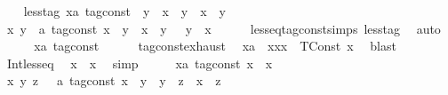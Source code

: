 \begin{isabellebody}
\isanewline
\ \ \isamarkupfalse%
\ less{\isacharunderscore}tag{\isacharcolon}\ {\isacartoucheopen}{\isacharparenleft}x{\isacharcolon}{\isacharcolon}{\isacharprime}a\ tag{\isacharunderscore}const{\isacharparenright}\ {\isacharless}\ y\ {\isasymlongleftrightarrow}\ {\isacharparenleft}x\ {\isasymle}\ y{\isacharparenright}\ {\isasymand}\ {\isacharparenleft}x\ {\isasymnoteq}\ y{\isacharparenright}{\isacartoucheclose}\isanewline
\isanewline
{}\isamarkupfalse%
%
\isadelimproof
\ %
\endisadelimproof
%
\isatagproof
{}\isamarkupfalse%
\isanewline
\ \ \isamarkupfalse%
\ {\isacartoucheopen}{\isasymAnd}x\ y\ {\isacharcolon}{\isacharcolon}\ {\isacharprime}a\ tag{\isacharunderscore}const{\isachardot}\ {\isacharparenleft}x\ {\isacharless}\ y{\isacharparenright}\ {\isacharequal}\ {\isacharparenleft}x\ {\isasymle}\ y\ {\isasymand}\ {\isasymnot}\ y\ {\isasymle}\ x{\isacharparenright}{\isacartoucheclose}\isanewline
\ \ \ \ \isamarkupfalse%
\ less{\isacharunderscore}eq{\isacharunderscore}tag{\isacharunderscore}const{\isachardot}simps\ less{\isacharunderscore}tag\ \isamarkupfalse%
\ auto\isanewline
{}\isamarkupfalse%
\isanewline
\ \ \isacommand{{\isacharbraceleft}}\isamarkupfalse%
\ \isamarkupfalse%
\ x{\isacharcolon}{\isacharcolon}{\isacartoucheopen}{\isacharprime}a\ tag{\isacharunderscore}const{\isacartoucheclose}\isanewline
\ \ \ \ \isamarkupfalse%
\ tag{\isacharunderscore}const{\isachardot}exhaust\ \isamarkupfalse%
\ xa\ \ xx{}{\isacharcolon}{\isacartoucheopen}x\ {\isacharequal}\ TConst\ x\ \isamarkupfalse%
\ blast\isanewline
\ \ \ \ \isamarkupfalse%
\ Int{\isacharunderscore}less{\isacharunderscore}eq\ \isamarkupfalse%
\ {\isacartoucheopen}x\ {\isasymle}\ x{\isacartoucheclose}\ \isamarkupfalse%
\ simp\isanewline
\ \ \isacommand{{\isacharbraceright}}\isamarkupfalse%
\ \isamarkupfalse%
\ {\isacartoucheopen}{\isasymAnd}x{\isacharcolon}{\isacharcolon}{\isacharprime}a\ tag{\isacharunderscore}const{\isachardot}\ x\ {\isasymle}\ x{\isacartoucheclose}\ \isacommand{{\isachardot}}\isamarkupfalse%
\isanewline
{}\isamarkupfalse%
\isanewline
\ \ \isamarkupfalse%
\ {\isacartoucheopen}{\isasymAnd}x\ y\ z\ \ {\isacharcolon}{\isacharcolon}\ {\isacharprime}a\ tag{\isacharunderscore}const{\isachardot}\ x\ {\isasymle}\ y\ {\isasymLongrightarrow}\ y\ {\isasymle}\ z\ {\isasymLongrightarrow}\ x\ {\isasymle}\ z{\isacartoucheclose}\isanewline

\end{isabellebody}
